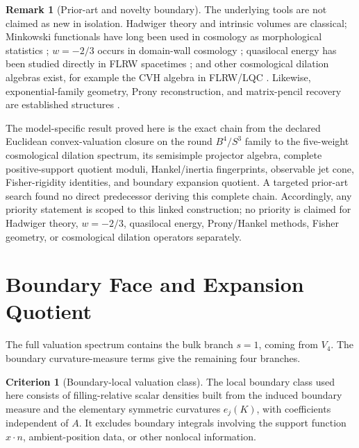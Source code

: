 \documentclass[aps,prd,reprint,onecolumn,nofootinbib,superscriptaddress,showkeys]{revtex4-2}
\numberwithin{equation}{section}
\theoremstyle{definition}
\newtheorem{criterion}{Criterion}[section]
\newtheorem{remark}{Remark}[section]
\theoremstyle{plain}
\begin{document}
\begin{remark}[Prior-art and novelty boundary]\label{rem:novelty-boundary}
The underlying tools are not claimed as new in isolation.  Hadwiger theory and intrinsic volumes are classical; Minkowski functionals have long been used in cosmology as morphological statistics \cite{SchmalzingKerscherBuchert1996}; \(w=-2/3\) occurs in domain-wall cosmology \cite{BattyeBucherSpergel1999}; quasilocal energy has been studied directly in FLRW spacetimes \cite{Afshar2009,OlteanEtAl2021}; and other cosmological dilation algebras exist, for example the CVH algebra in FLRW/LQC \cite{BenAchourLivine2017}.  Likewise, exponential-family geometry, Prony reconstruction, and matrix-pencil recovery are established structures \cite{HuaSarkar1990,PeterPlonka2013,FischerEtAl2020,Karev2010}.

The model-specific result proved here is the exact chain from the declared Euclidean convex-valuation closure on the round \(B^4/S^3\) family to the five-weight cosmological dilation spectrum, its semisimple projector algebra, complete positive-support quotient moduli, Hankel/inertia fingerprints, observable jet cone, Fisher-rigidity identities, and boundary expansion quotient.  A targeted prior-art search found no direct predecessor deriving this complete chain.  Accordingly, any priority statement is scoped to this linked construction; no priority is claimed for Hadwiger theory, \(w=-2/3\), quasilocal energy, Prony/Hankel methods, Fisher geometry, or cosmological dilation operators separately.
\end{remark}


\section{Boundary Face and Expansion Quotient}

The full valuation spectrum contains the bulk branch \(s=1\), coming from \(V_4\).  The boundary curvature-measure terms give the remaining four branches.

\begin{criterion}[Boundary-local valuation class]
The local boundary class used here consists of filling-relative scalar densities built from the induced boundary measure and the elementary symmetric curvatures \(e_j(K)\), with coefficients independent of \(A\).  It excludes boundary integrals involving the support function \(x\cdot n\), ambient-position data, or other nonlocal information.
\end{criterion}
\end{document}
